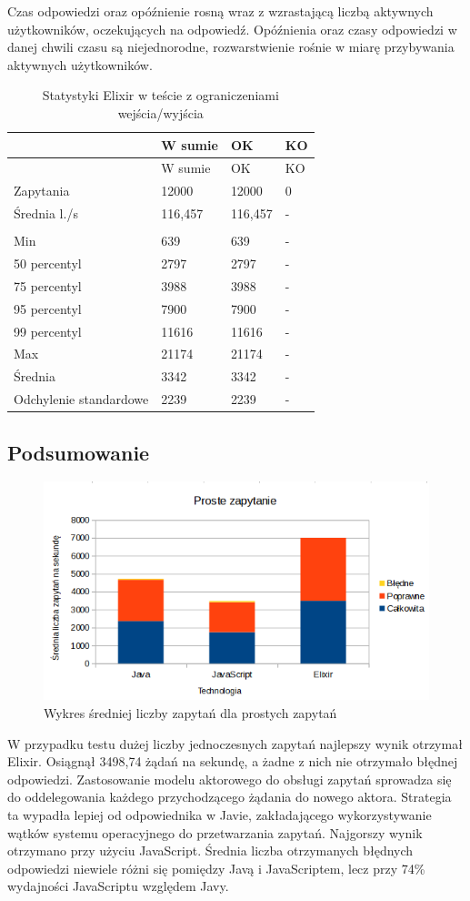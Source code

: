 \documentclass[12pt,twoside]{article}
\begin{document}
Czas odpowiedzi oraz opóźnienie rosną wraz z wzrastającą liczbą
aktywnych użytkowników, oczekujących na odpowiedź. Opóźnienia oraz czasy
odpowiedzi w danej chwili czasu są niejednorodne, rozwarstwienie rośnie
w miarę przybywania aktywnych użytkowników.

\begin{longtable}[c]{@{}llll@{}}
\caption{Statystyki Elixir w teście z ograniczeniami
wejścia/wyjścia}\tabularnewline
\toprule
& W sumie & OK & KO\tabularnewline
\midrule
\endfirsthead
\toprule
& W sumie & OK & KO\tabularnewline
\midrule
\endhead
Zapytania & 12000 & 12000 & 0\tabularnewline
Średnia l./s & 116,457 & 116,457 & -\tabularnewline
& & &\tabularnewline
Min & 639 & 639 & -\tabularnewline
50 percentyl & 2797 & 2797 & -\tabularnewline
75 percentyl & 3988 & 3988 & -\tabularnewline
95 percentyl & 7900 & 7900 & -\tabularnewline
99 percentyl & 11616 & 11616 & -\tabularnewline
Max & 21174 & 21174 & -\tabularnewline
Średnia & 3342 & 3342 & -\tabularnewline
Odchylenie standardowe & 2239 & 2239 & -\tabularnewline
\bottomrule
\end{longtable}

\clearpage

\subsection{Podsumowanie}\label{podsumowanie}

\begin{figure}[!ht]
\centering
\includegraphics[resolution=120]{test_results/summary/simple_avg.png}
\caption{Wykres średniej liczby zapytań dla prostych zapytań}
\end{figure}

W przypadku testu dużej liczby jednoczesnych zapytań najlepszy wynik
otrzymał Elixir. Osiągnął 3498,74 żądań na sekundę, a żadne z nich nie
otrzymało błędnej odpowiedzi. Zastosowanie modelu aktorowego do obsługi
zapytań sprowadza się do oddelegowania każdego przychodzącego żądania do
nowego aktora. Strategia ta wypadła lepiej od odpowiednika w Javie,
zakładającego wykorzystywanie wątków systemu operacyjnego do
przetwarzania zapytań. Najgorszy wynik otrzymano przy użyciu JavaScript.
Średnia liczba otrzymanych błędnych odpowiedzi niewiele różni się
pomiędzy Javą i JavaScriptem, lecz przy 74\% wydajności JavaScriptu
względem Javy.
\end{document}
